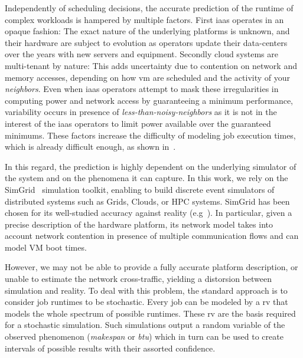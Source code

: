 \documentclass[10pt,conference,compsocconf]{IEEEtran}
\begin{document}
Independently of  scheduling decisions, the accurate prediction  of the  runtime of
complex workloads is hampered by  multiple factors.  First \ac{iaas} operates in
an opaque  fashion: The exact nature  of the underlying platforms  is unknown,
and their hardware are subject to evolution as operators update their data-centers
over  the years  with new  servers and  equipment.  Secondly  cloud systems  are
multi-tenant by nature: This adds uncertainty due to contention  on network and
memory accesses, depending on how \ac{vm} are scheduled and the activity of your
\emph{neighbors}.   Even   when  \ac{iaas}  operators  attempt   to  mask  these
irregularities in computing  power and network access by  guaranteeing a minimum
performance, variability occurs  in presence of \emph{less-than-noisy-neighbors}
as it is not in the interest of the \ac{iaas} operators to limit power available
over the guaranteed minimums.  These factors  increase the difficulty
of  modeling   job  execution  times, which is already difficult enough,  as  shown
in~\cite{Lastovetsky05}.

In this regard,  the prediction is highly dependent on  the underlying simulator
of the system and on the phenomena it  can capture. In this work, we rely on the
SimGrid~\cite{simgrid}  simulation toolkit,  enabling  to  build discrete  event
simulators of distributed systems such as Grids, Clouds, or HPC systems. SimGrid
has   been    chosen   for    its   well-studied   accuracy    against   reality
(e.g~\cite{StanisicTLVM15,VelhoSCL13}).    In   particular,  given   a   precise
description  of the  hardware platform,  its  network model  takes into  account
network contention in presence of multiple  communication flows and can model VM
boot times.

However, we may not be able to provide a fully accurate platform description, or
unable  to estimate  the network  cross-traffic, yielding  a distorsion  between
simulation and reality.  To deal with this problem, the  standard approach is to
consider job runtimes to  be stochastic.  Every job can be  modeled by a \ac{rv}
that models the whole spectrum of possible runtimes. These \ac{rv} are the basis
required for a stochastic simulation.  Such simulations output a random variable
of the  observed phenomenon (\emph{makespan}  or \emph{\ac{btu}}) which  in turn
can  be  used to  create  intervals  of  possible  results with  their  assorted
confidence.
\end{document}
